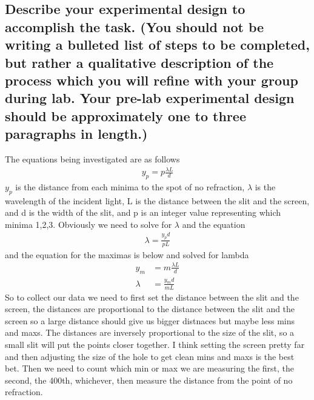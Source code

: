\documentclass{article}
\begin{document}
\subsection*{Describe your experimental design to accomplish the task. (You should not be writing a bulleted list of steps to be completed, but rather a qualitative description of the process which you will refine with your group during lab. Your pre-lab experimental design should be approximately one to three paragraphs in length.)}

    The equations being investigated are as follows 
    \begin{align}
        y_p = p\frac{\lambda L}{d}
    \end{align}
    $y_p$ is the distance from each minima to the spot of no refraction, $\lambda$ is the wavelength of the incident light, L is the distance between the slit and the screen, and d is the width of the slit, and p is an integer value representing which minima 1,2,3. Obviously we need to solve for $\lambda$ and the equation 
    \begin{align*}
        \lambda = \frac{y_p d}{p L}
    \end{align*}
    and the equation for the maximas is below and solved for lambda
    \begin{align}
        y_m &= m\frac{\lambda L}{d}\\
        \lambda &= \frac{y_m d}{m L}
    \end{align}
    So to collect our data we need to first set the distance between the slit and the screen, the distances are proportional to the distance between the slit and the screen so a large distance should give us bigger distnaces but maybe less mins and maxs. The distances are inversely proportional to the size of the slit, so a small slit will put the points closer together. I think setting the screen pretty far and then adjusting the size of the hole to get clean mins and maxs is the best bet. Then we need to count which min or max we are measuring the first, the second, the 400th, whichever, then measure the distance from the point of no refraction. 
\end{document}
